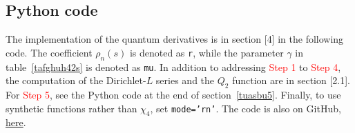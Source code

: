 \documentclass[oneside,10pt]{book}
\begin{document}
\subsection{Python code}\label{l4code}

The implementation of the quantum derivatives is in section [4] in the following code. The coefficient
 $\rho_n(s)$ is denoted as \texttt{r}, while the parameter $\gamma$ in table~\ref{tafghuh42s} is denoted as \texttt{mu}.
In addition to addressing \textcolor{red}{Step 1} to \textcolor{red}{Step 4}, the computation of the Dirichlet-$L$ series  
 and the $Q_2$ function are in section [2.1]. For \textcolor{red}{Step 5}, see the Python code at the end of section~\ref{tuasbu5}.
Finally, to use synthetic functions rather than $\chi_4$, set \texttt{mode='rn'}.
The code is also on GitHub, 
\href{https://github.com/VincentGranville/Experimental-Math-Number-Theory/blob/main/Source-Code/Dirichlet_L4_product_fitting.py}{here}.
\vspace{1ex}
\end{document}
